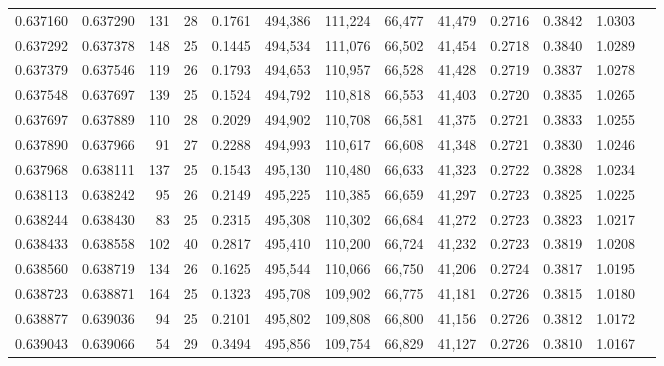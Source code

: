 \begin{tabular}{rrrrrrrrrrrrr}
0.637160 & 0.637290 &   131 &  28 &                                     0.1761 & 494,386 & 111,224 &  66,477 &  41,479 & 0.2716 & 0.3842 & 1.0303 \\
0.637292 & 0.637378 &   148 &  25 &                                     0.1445 & 494,534 & 111,076 &  66,502 &  41,454 & 0.2718 & 0.3840 & 1.0289 \\
0.637379 & 0.637546 &   119 &  26 &                                     0.1793 & 494,653 & 110,957 &  66,528 &  41,428 & 0.2719 & 0.3837 & 1.0278 \\
0.637548 & 0.637697 &   139 &  25 &                                     0.1524 & 494,792 & 110,818 &  66,553 &  41,403 & 0.2720 & 0.3835 & 1.0265 \\
0.637697 & 0.637889 &   110 &  28 &                                     0.2029 & 494,902 & 110,708 &  66,581 &  41,375 & 0.2721 & 0.3833 & 1.0255 \\
0.637890 & 0.637966 &    91 &  27 &                                     0.2288 & 494,993 & 110,617 &  66,608 &  41,348 & 0.2721 & 0.3830 & 1.0246 \\
0.637968 & 0.638111 &   137 &  25 &                                     0.1543 & 495,130 & 110,480 &  66,633 &  41,323 & 0.2722 & 0.3828 & 1.0234 \\
0.638113 & 0.638242 &    95 &  26 &                                     0.2149 & 495,225 & 110,385 &  66,659 &  41,297 & 0.2723 & 0.3825 & 1.0225 \\
0.638244 & 0.638430 &    83 &  25 &                                     0.2315 & 495,308 & 110,302 &  66,684 &  41,272 & 0.2723 & 0.3823 & 1.0217 \\
0.638433 & 0.638558 &   102 &  40 &                                     0.2817 & 495,410 & 110,200 &  66,724 &  41,232 & 0.2723 & 0.3819 & 1.0208 \\
0.638560 & 0.638719 &   134 &  26 &                                     0.1625 & 495,544 & 110,066 &  66,750 &  41,206 & 0.2724 & 0.3817 & 1.0195 \\
0.638723 & 0.638871 &   164 &  25 &                                     0.1323 & 495,708 & 109,902 &  66,775 &  41,181 & 0.2726 & 0.3815 & 1.0180 \\
0.638877 & 0.639036 &    94 &  25 &                                     0.2101 & 495,802 & 109,808 &  66,800 &  41,156 & 0.2726 & 0.3812 & 1.0172 \\
0.639043 & 0.639066 &    54 &  29 &                                     0.3494 & 495,856 & 109,754 &  66,829 &  41,127 & 0.2726 & 0.3810 & 1.0167 \\

\end{tabular}
